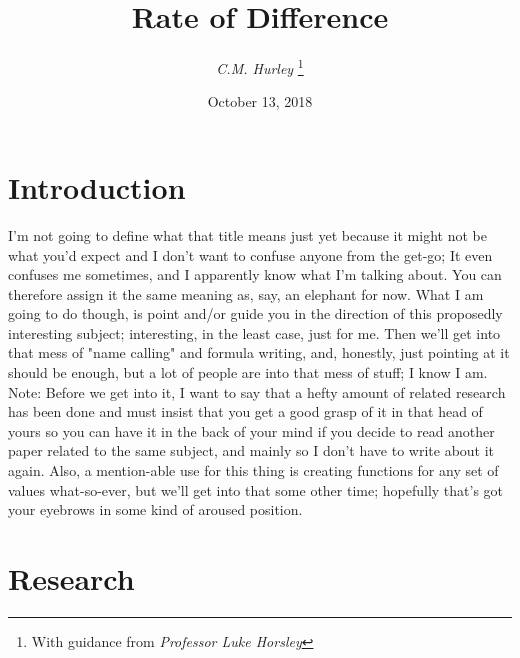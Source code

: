 \documentclass[12pt, letterpaper]{report}
\title{Rate of Difference}
\author{\textit{C.M. Hurley} \thanks{With guidance from \textit{Professor Luke Horsley}}}
\date{October 13, 2018}
\begin{document}
	\maketitle

\section*{Introduction}
\hspace{0.5cm}I'm not going to define what that title means just yet because it might not be what you'd expect and I don't want to confuse anyone from the get-go; It even confuses me sometimes, and I apparently know what I'm talking about. You can therefore assign it the same meaning as, say, an elephant for now. What I am going to do though, is point and/or guide you in the direction of this proposedly interesting subject; interesting, in the least case, just for me. Then we'll get into that mess of "name calling" and formula writing, and, honestly, just pointing at it should be enough, but a lot of people are into that mess of stuff; I know I am. Note: Before we get into it, I want to say that a hefty amount of related research has been done and must insist that you get a good grasp of it in that head of yours so you can have it in the back of your mind if you decide to read another paper related to the same subject, and mainly so I don't have to write about it again. Also, a mention-able use for this thing is creating functions for any set of values what-so-ever, but we'll get into that some other time; hopefully that's got your eyebrows in some kind of aroused position.

\section*{Research}
\end{document}
